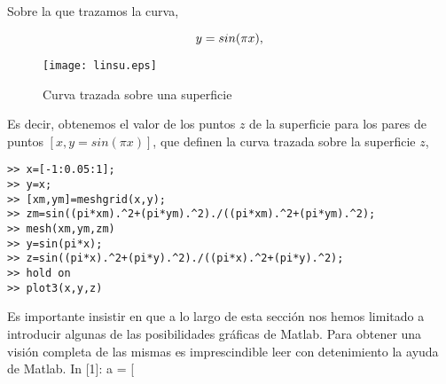 Sobre la que trazamos la curva,

\begin{equation*}
y=sin(\pi x),\\
\end{equation*}

\begin{figure}[h]
\centering
\texttt{[image: linsu.eps]}
\caption{Curva trazada sobre una superficie}
\label{fig:cvsurf}
\end{figure}

Es decir, obtenemos el valor de los puntos $z$ de la superficie para los pares de puntos $[x, y = sin(\pi x)]$, que definen la curva trazada sobre la superficie $z$,

\begin{verbatim}
>> x=[-1:0.05:1];
>> y=x;
>> [xm,ym]=meshgrid(x,y);
>> zm=sin((pi*xm).^2+(pi*ym).^2)./((pi*xm).^2+(pi*ym).^2);
>> mesh(xm,ym,zm)
>> y=sin(pi*x);
>> z=sin((pi*x).^2+(pi*y).^2)./((pi*x).^2+(pi*y).^2);
>> hold on
>> plot3(x,y,z)
\end{verbatim}

Es importante insistir en que a lo largo de esta sección nos hemos limitado a introducir algunas de las posibilidades gráficas de Matlab. Para obtener una visión completa de las mismas es imprescindible leer con detenimiento la ayuda de Matlab.
In [1]: a = [